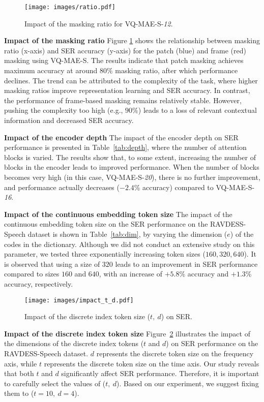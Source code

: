 \documentclass{article}
\newcommand{\myparagraph}[1]{\noindent\textbf{#1}\hspace{.25cm}}
\begin{document}
\begin{figure}[h]
    \centering
    \texttt{[image: images/ratio.pdf]}
    \caption{Impact of the masking ratio for VQ-MAE-S-\emph{12}.}
    \label{fig:ratio}
\end{figure}
\myparagraph{Impact of the masking ratio} Figure \ref{fig:ratio} shows the relationship between masking ratio (x-axis) and SER accuracy (y-axis) for the patch (blue) and frame (red) masking using VQ-MAE-S. The results indicate that patch masking achieves maximum accuracy at around $80\%$ masking ratio, after which performance declines. The trend can be attributed to the complexity of the task, where higher masking ratios improve representation learning and SER accuracy. In contrast, the performance of frame-based masking remains relatively stable. However, pushing the complexity too high (e.g., $90\%$) leads to a loss of relevant contextual information and decreased SER accuracy.


\myparagraph{Impact of the encoder depth}
The impact of the encoder depth on SER performance is presented in Table~\ref{tab:depth}, where the number of attention blocks is varied. The results show that, to some extent, increasing the number of blocks in the encoder leads to improved performance. When the number of blocks becomes very high (in this case, VQ-MAE-S-\emph{20}), there is no further improvement, and performance actually decreases ($-2.4$\% accuracy) compared to VQ-MAE-S-\emph{16}.

\myparagraph{Impact of the continuous embedding token size} The impact of the continuous embedding token size on the SER performance on the RAVDESS-Speech dataset is shown in Table~\ref{tab:dim}, by varying the dimension ($e$) of the codes in the dictionary. Although we did not conduct an extensive study on this parameter, we tested three exponentially increasing token sizes ($160, 320, 640$). It is observed that using a size of $320$ leads to an improvement in SER performance compared to sizes $160$ and $640$, with an increase of $+5.8$\% accuracy and $+1.3$\% accuracy, respectively.

\begin{figure}[h]
    \centering
    \texttt{[image: images/impact\_t\_d.pdf]}
    \caption{Impact of the discrete index token size ($t,~d$) on SER.}
    \label{fig:patch}
\end{figure}

\myparagraph{Impact of the discrete index token size}
Figure~\ref{fig:patch} illustrates the impact of the dimensions of the discrete index tokens ($t$ and $d$) on SER performance on the RAVDESS-Speech dataset. $d$ represents the discrete token size on the frequency axis, while $t$ represents the discrete token size on the time axis. Our study reveals that both $t$ and $d$ significantly affect SER performance. Therefore, it is important to carefully select the values of ($t,~d$). Based on our experiment, we suggest fixing them to ($t=10,~d=4$).
\end{document}
